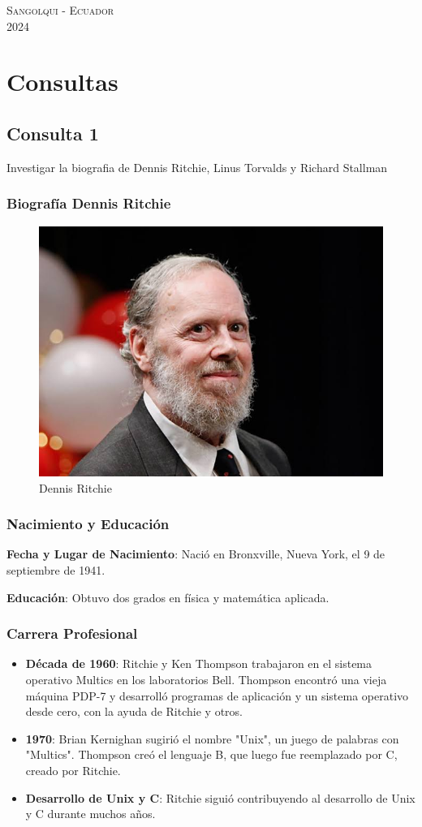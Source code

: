 \documentclass[11pt,twoside]{book}
\begin{document}
\begin{center} \Large \textsc{Sangolqui - Ecuador} \\
  \vspace{0.5cm}
  \Large \textsc{2024 } \end{center}
\let\cleardoublepage\clearpage
\chapter{Consultas}
\section{Consulta 1}
Investigar la biografia de Dennis Ritchie, Linus Torvalds y Richard Stallman
\vspace{5pt}
\subsection{{\bfseries Biografía Dennis Ritchie}}
\begin{figure}[htb]
  \centering
  \includegraphics[width=0.5\linewidth]{D.R.png}
  \caption{Dennis Ritchie}
  \label{fig:etiqueta}
\end{figure}

\vspace{5pt}
\subsection*{Nacimiento y Educación}

\textbf{Fecha y Lugar de Nacimiento}: Nació en Bronxville, Nueva York, el 9 de septiembre de 1941.

\textbf{Educación}: Obtuvo dos grados en física y matemática aplicada.

\subsection*{ Carrera Profesional}
\begin{itemize}


  \item \textbf{Década de 1960}: Ritchie y Ken Thompson trabajaron en el sistema operativo Multics en los laboratorios Bell. Thompson encontró una vieja máquina PDP-7 y desarrolló programas de aplicación y un sistema operativo desde cero, con la ayuda de Ritchie y otros.
  \item \textbf{1970}: Brian Kernighan sugirió el nombre "Unix", un juego de palabras con "Multics". Thompson creó el lenguaje B, que luego fue reemplazado por C, creado por Ritchie.
  \item  \textbf{Desarrollo de Unix y C}: Ritchie siguió contribuyendo al desarrollo de Unix y C durante muchos años.
\end{itemize}
\end{document}

